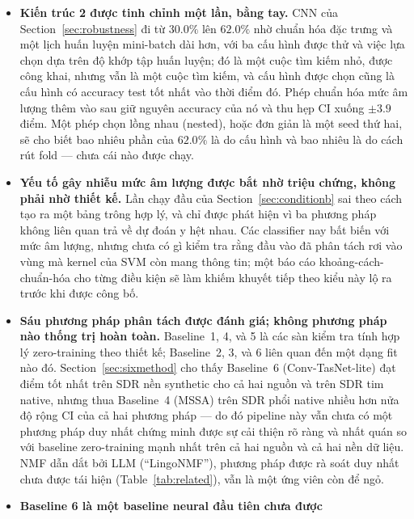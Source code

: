 \documentclass[11pt]{article}
\begin{document}
\begin{itemize}
    hợp lệ hơn HLS-CMDS có, và đó là việc của nền tổng hợp
    (Section~\ref{sec:synthetic}); chạy sweep và cả hai classifier trên
    1500 hàng của nó là bước tiếp theo trực tiếp.
  \item \textbf{Kiến trúc 2 được tinh chỉnh một lần, bằng tay.} CNN của
    Section~\ref{sec:robustness} đi từ $30.0\%$ lên $62.0\%$ nhờ chuẩn
    hóa đặc trưng và một lịch huấn luyện mini-batch dài hơn, với ba cấu
    hình được thử và việc lựa chọn dựa trên độ khớp tập huấn luyện; đó là
    một cuộc tìm kiếm nhỏ, được công khai, nhưng vẫn là một cuộc tìm
    kiếm, và cấu hình được chọn cũng là cấu hình có accuracy test tốt
    nhất vào thời điểm đó. Phép chuẩn hóa mức âm lượng thêm vào sau giữ
    nguyên accuracy của nó và thu hẹp CI xuống $\pm3.9$ điểm. Một phép
    chọn lồng nhau (nested), hoặc đơn giản là một seed thứ hai, sẽ cho
    biết bao nhiêu phần của $62.0\%$ là do cấu hình và bao nhiêu là do
    cách rút fold --- chưa cái nào được chạy.
  \item \textbf{Yếu tố gây nhiễu mức âm lượng được bắt nhờ triệu chứng,
    không phải nhờ thiết kế.} Lần chạy đầu của Section~\ref{sec:conditionb}
    sai theo cách tạo ra một bảng trông hợp lý, và chỉ được phát hiện vì
    ba phương pháp không liên quan trả về dự đoán y hệt nhau. Các
    classifier nay bất biến với mức âm lượng, nhưng chưa có gì kiểm tra
    rằng đầu vào đã phân tách rơi vào vùng mà kernel của SVM còn mang
    thông tin; một báo cáo khoảng-cách-chuẩn-hóa cho từng điều kiện sẽ
    làm khiếm khuyết tiếp theo kiểu này lộ ra trước khi được công bố.
  \item \textbf{Sáu phương pháp phân tách được đánh giá; không phương
    pháp nào thống trị hoàn toàn.} Baseline~1, 4, và 5 là các sàn kiểm
    tra tính hợp lý zero-training theo thiết kế; Baseline~2, 3, và 6
    liên quan đến một dạng fit nào đó. Section~\ref{sec:sixmethod} cho
    thấy Baseline~6 (Conv-TasNet-lite) đạt điểm tốt nhất trên SDR nền
    synthetic cho cả hai nguồn và trên SDR tim native, nhưng thua
    Baseline~4 (MSSA) trên SDR phổi native nhiều hơn nửa độ rộng CI của
    cả hai phương pháp --- do đó pipeline này vẫn chưa có một phương
    pháp duy nhất chứng minh được sự cải thiện rõ ràng và nhất quán so
    với baseline zero-training mạnh nhất trên cả hai nguồn và cả hai
    nền dữ liệu. NMF dẫn dắt bởi LLM (``LingoNMF''), phương pháp được rà
    soát duy nhất chưa được tái hiện (Table~\ref{tab:related}), vẫn là
    một ứng viên còn để ngỏ.
  \item \textbf{Baseline 6 là một baseline neural đầu tiên chưa được
}
\end{itemize}
\end{document}
